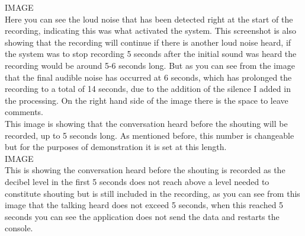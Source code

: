 \documentclass[a4paper,11pt]{report}
\begin{document}
IMAGE\\

Here you can see the loud noise that has been detected right at the start of the recording, indicating this was what activated the system. This screenshot is also showing that the recording will continue if there is another loud noise heard, if the system was to stop recording 5 seconds after the initial sound was heard the recording would be around 5-6 seconds long. But as you can see from the image that the final audible noise has occurred at 6 seconds, which has prolonged the recording to a total of 14 seconds, due to the addition of the silence I added in the processing. On the right hand side of the image there is the space to leave comments. \\

This image is showing that the conversation heard before the shouting will be recorded, up to 5 seconds long. As mentioned before, this number is changeable but for the purposes of demonstration it is set at this length.\\

IMAGE\\

This is showing the conversation heard before the shouting is recorded as the decibel level in the first 5 seconds does not reach above a level needed to constitute shouting but is still included in the recording, as you can see from this image that the talking heard does not exceed 5 seconds, when this reached 5 seconds you can see the application does not send the data and restarts the console. \\
\end{document}
